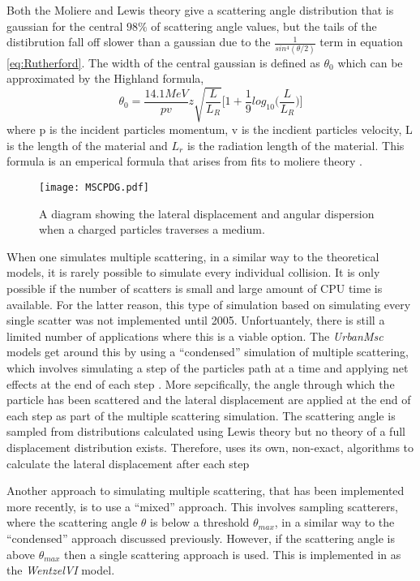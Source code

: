 Both the Moliere and Lewis theory give a scattering angle distribution that is gaussian for the central $98\%$ of scattering angle values, but the tails of the distibrution fall off slower than a gaussian due to the $\frac{1}{sin^4(\theta/2)}$ term in equation \ref{eq:Rutherford}.  The width of the central gaussian is defined as $\theta_0$ which can be approximated by the Highland formula,
\begin{equation}
  \label{eq:Highland}
  \theta_0=\frac{14.1MeV}{pv}z\sqrt{\frac{L}{L_R}}\big[1+\frac{1}{9}log_{10}\big(\frac{L}{L_R}\big)\big]
\end{equation}
where p is the incident particles momentum, v is the incdient particles velocity, L is the length of the material and $L_r$ is the radiation length of the material.  This formula is an emperical formula that arises from fits to moliere theory \cite{Highland1975497}.

\begin{figure}[h]
  \centering
  \texttt{[image: MSCPDG.pdf]}
  \caption{A diagram showing the lateral displacement and angular dispersion when a charged particles traverses a medium.}
  \label{fig:MSCPDG}
\end{figure}

When one simulates multiple scattering, in a similar way to the theoretical models, it is rarely possible to simulate every individual collision.  It is only possible if the number of scatters is small and large amount of CPU time is available.  For the latter reason, this type of simulation based on simulating every single scatter was not implemented until 2005.  Unfortuantely, there is still a limited number of applications where this is a viable option.  The \textit{UrbanMsc} models get around this by using  a ``condensed'' simulation of multiple scattering, which involves simulating a step of the particles path at a time and applying net effects at the end of each step \cite{Urbàn:592633}.  More sepcifically, the angle through which the particle has been scattered and the lateral displacement are applied at the end of each step as part of the multiple scattering simulation.  The scattering angle is sampled from distributions calculated using Lewis theory but no theory of a full displacement distribution exists.  Therefore, \geant uses its own, non-exact, algorithms to calculate the lateral displacement after each step %

Another approach to simulating multiple scattering, that has been implemented more recently, is to use a ``mixed'' approach.  This involves sampling scatterers, where the scattering angle $\theta$ is below a threshold $\theta_{max}$, in a similar way to the ``condensed'' approach discussed previously.  However, if the scattering angle is above $\theta_{max}$ then a single scattering approach is used.  This is implemented in \geant as the \textit{WentzelVI} model.

